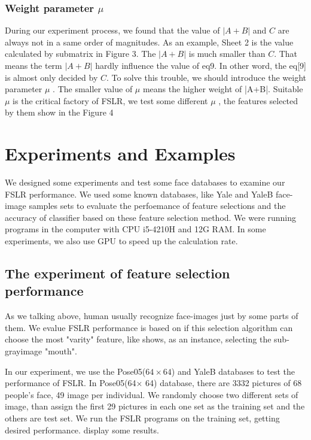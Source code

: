 \documentclass[10pt,journal,final,twocolumn,]{IEEEtran}
\begin{document}
	\subsubsection{\textbf{Weight parameter $\mu$}}
	During our experiment process, we found that the value of $|A+B|$ and $C$ are always not in a same order of magnitudes. As an example, Sheet 2 is the value calculated by submatrix in Figure 3. The $|A+B|$ is much smaller than $C$. That means the term $|A+B|$ hardly influence the value of eq{9}. In other word, the eq[9] is almost only decided by $C$. To solve this trouble, we should introduce the weight parameter $\mu$ . The smaller value of $\mu$ means the higher weight of |A+B|. Suitable $\mu$ is the critical factory of FSLR, we test some different $\mu$ , the features selected by them show in the Figure 4
	
	{\color{red}{THE FEATURE SELECTED BY DIFFERENT $\mu$}}
	
	
	\section{\textbf{Experiments and Examples}}
	We designed some experiments and test some face databases to examine our FSLR performance. We used some known databases, like Yale and YaleB face-image samples sets to evaluate the perfoemance of feature selections and the accuracy of classifier based on these feature selection method. We were running programs in the computer with CPU i5-4210H and 12G RAM. In some experiments, we also use  GPU to speed up the calculation rate.
	\subsection{\textbf{The experiment of feature selection performance}}
	As we talking above, human usually recognize face-images just by some parts of them. We evalue FSLR performance is based on if this selection algorithm can choose the most "varity" feature, like {\color{red}{Figure 5}} shows, as an instance,  selecting the sub-grayimage "mouth".
	
	In our experiment, we use the Pose05($64\times 64$) and YaleB databases to test the performance of FSLR. In Pose05(64$\times$ 64) database, there are 3332 pictures of 68 people's face, 49 image per individual. We randomly choose two different sets of image, than assign the first 29 pictures in each one set as the training set and the others are test set. We run the FSLR programs on the training set, getting desired performance. {\color{red}{Figure 6}} display some results.
	
\end{document}
